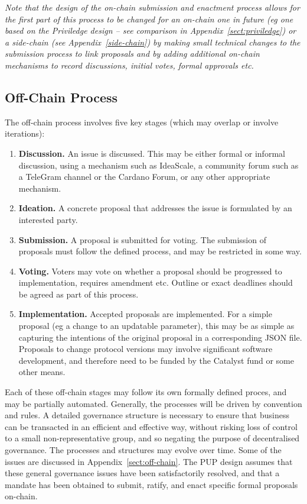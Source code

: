 \emph{Note that the design of the on-chain submission and enactment process allows for the first part of this process to be changed for an on-chain one in future
  (eg one based on the Priviledge design -- see comparison in Appendix~\ref{sect:priviledge}) or a side-chain (see Appendix~\ref{side-chain}) by making small technical
  changes to the submission process to link proposals and by adding additional on-chain mechanisms to record discussions, initial votes, formal approvals etc.}


\newpage
\subsection{Off-Chain Process}

The off-chain process involves five key stages (which may overlap or involve iterations):

\begin{enumerate}
\item
  \textbf{Discussion.}  An issue is discussed.  This may be either formal or informal discussion, using a mechanism such as IdeaScale, a community forum such as a TeleGram channel or the Cardano Forum,
  or any other appropriate mechanism.
\item
  \textbf{Ideation.}  A concrete proposal that addresses the issue is formulated by an interested party.
\item
  \textbf{Submission.}  A proposal is submitted for voting.  The submission of proposals must follow the defined process, and may be restricted in some way.
\item
  \textbf{Voting.}  Voters may vote on whether a proposal should be progressed to implementation, requires amendment etc.  Outline or exact deadlines should be agreed as part of this process.
\item
  \textbf{Implementation.}  Accepted proposals are implemented.  For a simple proposal (eg a change to an updatable parameter), this may be as simple as capturing the intentions of the original proposal in a corresponding JSON file.
  Proposals to change protocol versions may involve significant software development, and therefore need to be funded by the Catalyst fund or some other means.
\end{enumerate}

Each of these off-chain stages may follow its own formally defined proces, and may be partially automated.  Generally, the processes will be driven by convention and rules.  A detailed governance structure is necessary to ensure that business can
be transacted in an efficient and effective way, without risking loss of control to a small non-representative group, and so negating the purpose of decentralised governance.
The processes and structures may evolve over time.  Some of the issues are discussed in Appendix~\ref{sect:off-chain}.  The PUP design assumes that these general governance
issues have been satisfactorily resolved, and that a mandate has been obtained to submit, ratify, and enact specific formal proposals on-chain.


